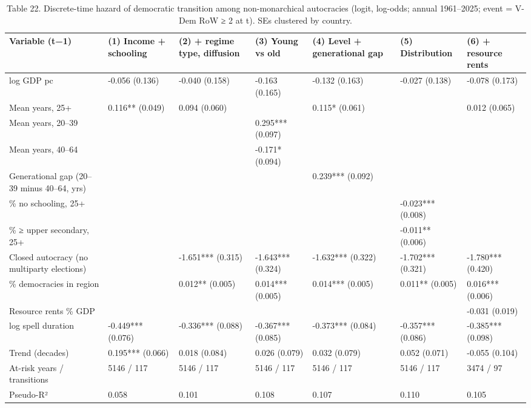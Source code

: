 \begin{table}
\caption{Table 22. Discrete-time hazard of democratic transition among non-monarchical autocracies (logit, log-odds; annual 1961–2025; event = V-Dem RoW ≥ 2 at t). SEs clustered by country.}
\label{tab:T22_hazard}
\begin{tabular}{lllllll}
\toprule
Variable (t−1) & (1) Income + schooling & (2) + regime type, diffusion & (3) Young vs old & (4) Level + generational gap & (5) Distribution & (6) + resource rents \\
\midrule
log GDP pc & -0.056 (0.136) & -0.040 (0.158) & -0.163 (0.165) & -0.132 (0.163) & -0.027 (0.138) & -0.078 (0.173) \\
Mean years, 25+ & 0.116** (0.049) & 0.094 (0.060) &  & 0.115* (0.061) &  & 0.012 (0.065) \\
Mean years, 20–39 &  &  & 0.295*** (0.097) &  &  &  \\
Mean years, 40–64 &  &  & -0.171* (0.094) &  &  &  \\
Generational gap (20–39 minus 40–64, yrs) &  &  &  & 0.239*** (0.092) &  &  \\
\% no schooling, 25+ &  &  &  &  & -0.023*** (0.008) &  \\
\% ≥ upper secondary, 25+ &  &  &  &  & -0.011** (0.006) &  \\
Closed autocracy (no multiparty elections) &  & -1.651*** (0.315) & -1.643*** (0.324) & -1.632*** (0.322) & -1.702*** (0.321) & -1.780*** (0.420) \\
\% democracies in region &  & 0.012** (0.005) & 0.014*** (0.005) & 0.014*** (0.005) & 0.011** (0.005) & 0.016*** (0.006) \\
Resource rents \% GDP &  &  &  &  &  & -0.031 (0.019) \\
log spell duration & -0.449*** (0.076) & -0.336*** (0.088) & -0.367*** (0.085) & -0.373*** (0.084) & -0.357*** (0.086) & -0.385*** (0.098) \\
Trend (decades) & 0.195*** (0.066) & 0.018 (0.084) & 0.026 (0.079) & 0.032 (0.079) & 0.052 (0.071) & -0.055 (0.104) \\
At-risk years / transitions & 5146 / 117 & 5146 / 117 & 5146 / 117 & 5146 / 117 & 5146 / 117 & 3474 / 97 \\
Pseudo-R² & 0.058 & 0.101 & 0.108 & 0.107 & 0.110 & 0.105 \\
\bottomrule
\end{tabular}
\end{table}
